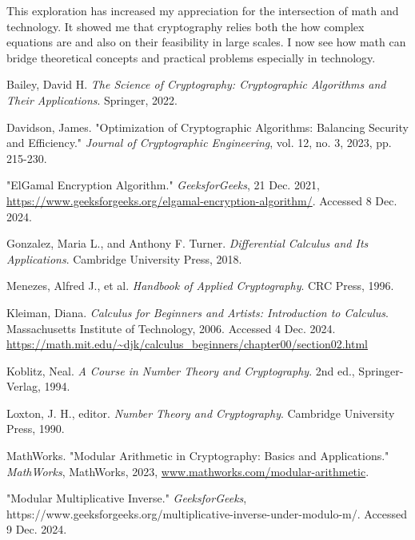 \documentclass[12pt]{article}
\begin{document}
This exploration has increased my appreciation for the intersection of math and technology. It showed me that cryptography relies both the how complex equations are and also on their feasibility in large scales. I now see how math can bridge theoretical concepts and practical problems especially in technology.



\newpage

\renewcommand{\refname}{Works Cited}
\begin{thebibliography}{9}

Bailey, David H. \textit{The Science of Cryptography: Cryptographic Algorithms and Their Applications}. Springer, 2022.

Davidson, James. "Optimization of Cryptographic Algorithms: Balancing Security and Efficiency." \textit{Journal of Cryptographic Engineering}, vol. 12, no. 3, 2023, pp. 215-230.

"ElGamal Encryption Algorithm." \textit{GeeksforGeeks}, 21 Dec. 2021, \url{https://www.geeksforgeeks.org/elgamal-encryption-algorithm/}. Accessed 8 Dec. 2024.

Gonzalez, Maria L., and Anthony F. Turner. \textit{Differential Calculus and Its Applications}. Cambridge University Press, 2018.

Menezes, Alfred J., et al. \textit{Handbook of Applied Cryptography}. CRC Press, 1996.

Kleiman, Diana. \textit{Calculus for Beginners and Artists: Introduction to Calculus}. Massachusetts Institute of Technology, 2006. Accessed 4 Dec. 2024. \url{https://math.mit.edu/~djk/calculus\_beginners/chapter00/section02.html}

Koblitz, Neal. \textit{A Course in Number Theory and Cryptography}. 2nd ed., Springer-Verlag, 1994.

Loxton, J. H., editor. \textit{Number Theory and Cryptography}. Cambridge University Press, 1990.

MathWorks. "Modular Arithmetic in Cryptography: Basics and Applications." \textit{MathWorks}, MathWorks, 2023, \url{www.mathworks.com/modular-arithmetic}.

"Modular Multiplicative Inverse." \textit{GeeksforGeeks}, https://www.geeksforgeeks.org/multiplicative-inverse-under-modulo-m/. Accessed 9 Dec. 2024.


\end{thebibliography}
\end{document}
